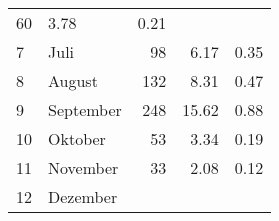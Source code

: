 \begin{longtable}{lXrrr}
       \num{60} &
       \num[round-mode=places,round-precision=2]{3,78} &
         \num[round-mode=places,round-precision=2]{0,21} \\

     7 &
     \multicolumn{1}{X}{ Juli   } &


       \num{98} &
       \num[round-mode=places,round-precision=2]{6,17} &
         \num[round-mode=places,round-precision=2]{0,35} \\

     8 &
     \multicolumn{1}{X}{ August   } &


       \num{132} &
       \num[round-mode=places,round-precision=2]{8,31} &
         \num[round-mode=places,round-precision=2]{0,47} \\

     9 &
     \multicolumn{1}{X}{ September   } &


       \num{248} &
       \num[round-mode=places,round-precision=2]{15,62} &
         \num[round-mode=places,round-precision=2]{0,88} \\

     10 &
     \multicolumn{1}{X}{ Oktober   } &


       \num{53} &
       \num[round-mode=places,round-precision=2]{3,34} &
         \num[round-mode=places,round-precision=2]{0,19} \\

     11 &
     \multicolumn{1}{X}{ November   } &


       \num{33} &
       \num[round-mode=places,round-precision=2]{2,08} &
         \num[round-mode=places,round-precision=2]{0,12} \\

     12 &
     \multicolumn{1}{X}{ Dezember   } &



\end{longtable}
